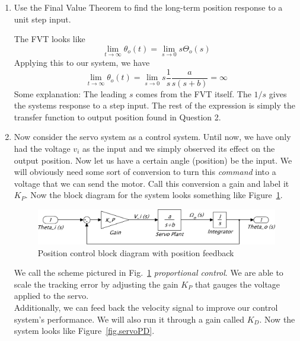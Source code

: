 \begin{enumerate}
\item
    Use the Final Value Theorem to find the long-term position response to a unit step input.
        \begin{solposcon}
        The FVT looks like
        \begin{equation}
            \lim_{t\to\infty} \theta_o(t) = \lim_{s\to0}s\Theta_o(s)
        \end{equation}
        Applying this to our system, we have
        \begin{equation}
            \lim_{t\to\infty} \theta_o(t)
            =
            \lim_{s\to0} s \frac{1}{s} \frac{a}{s(s+b)} = \infty
        \end{equation}
        Some explanation:  The leading $s$ comes from the FVT itself.  The $1/s$ gives the systems response to a step input.  The rest of the expression is simply the transfer function to output position found in Question 2.
        \end{solposcon}
\item
    Now consider the servo system as a control system.  Until now, we have only had the voltage $v_i$ as the input and we simply observed its effect on the output position.  Now let us have a certain angle (position) be the input. We will obviously need some sort of conversion to turn this \textit{command} into a voltage that we can send the motor.  Call this conversion a gain and label it $K_P$.  Now the block diagram for the system looks something like Figure~\ref{fig.servoKp}.
    \begin{figure}[hbt]
    \centering
    \includegraphics[width=.9\textwidth]{posconprelabKP}
    \caption{\footnotesize
            Position control block diagram with position feedback
            \label{fig.servoKp}
            }
    \end{figure}
    We call the scheme pictured in Fig.\ \ref{fig.servoKp} \textit{proportional control}.  We are able to scale the tracking error by adjusting the gain $K_P$ that gauges the voltage applied to the servo. \\
    Additionally, we can feed back the velocity signal to improve our control system's performance.  We will also run it through a gain called $K_D$.  Now the system looks like Figure~\ref{fig.servoPD}.
    \begin{figure}[bht]

\end{figure}
\end{enumerate}

